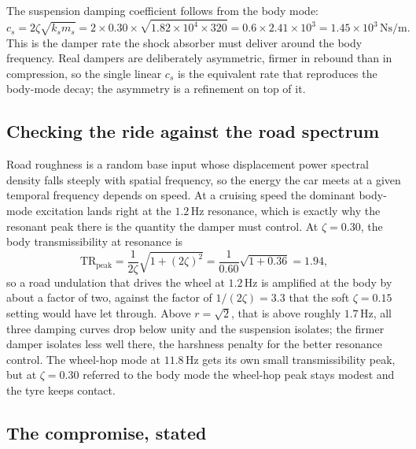 

The suspension damping coefficient follows from the body mode:
\[
c_s = 2\zeta\sqrt{k_s m_s} = 2\times 0.30\times\sqrt{1.82\times 10^4
\times 320} = 0.6\times 2.41\times 10^3 = 1.45\times 10^3\,\si{\newton
\second\per\meter}.
\]
This is the damper rate the shock absorber must deliver around the body
frequency. Real dampers are deliberately asymmetric, firmer in rebound
than in compression, so the single linear $c_s$ is the equivalent rate
that reproduces the body-mode decay; the asymmetry is a refinement on
top of it.

\subsection{Checking the ride against the road spectrum}

Road roughness is a random base input whose displacement power spectral
density falls steeply with spatial frequency, so the energy the car
meets at a given temporal frequency depends on speed. At a cruising
speed the dominant body-mode excitation lands right at the $1.2\,\si{
\hertz}$ resonance, which is exactly why the resonant peak there is the
quantity the damper must control. At $\zeta = 0.30$, the body
transmissibility at resonance is
\[
\mathrm{TR}_{\text{peak}} = \frac{1}{2\zeta}\sqrt{1 + (2\zeta)^2} =
\frac{1}{0.60}\sqrt{1 + 0.36} = 1.94,
\]
so a road undulation that drives the wheel at $1.2\,\si{\hertz}$ is
amplified at the body by about a factor of two, against the factor of
$1/(2\zeta) = 3.3$ that the soft $\zeta = 0.15$ setting would have let
through. Above $r = \sqrt2$, that is above roughly $1.7\,\si{\hertz}$,
all three damping curves drop below unity and the suspension isolates;
the firmer damper isolates less well there, the harshness penalty for
the better resonance control. The wheel-hop mode at $11.8\,\si{\hertz}$
gets its own small transmissibility peak, but at $\zeta = 0.30$ referred
to the body mode the wheel-hop peak stays modest and the tyre keeps
contact.

\subsection{The compromise, stated}

